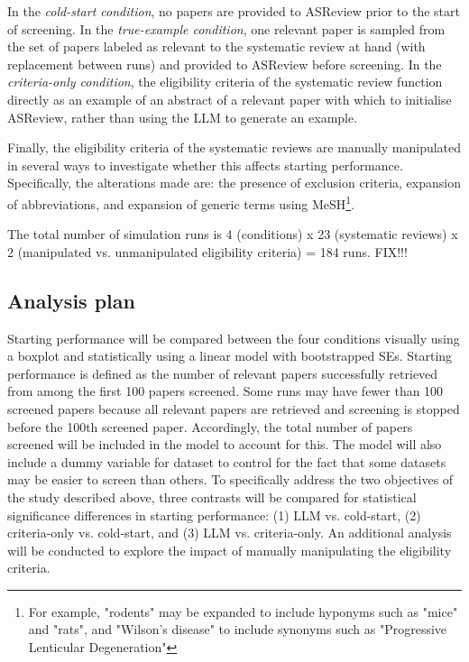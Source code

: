 \documentclass[12pt]{article}
\begin{document}
In the \textit{cold-start condition}, no papers are provided to ASReview prior to the start of screening. In the \textit{true-example condition}, one relevant paper is sampled from the set of papers labeled as relevant to the systematic review at hand (with replacement between runs) and provided to ASReview before screening. In the \textit{criteria-only condition}, the eligibility criteria of the systematic review function directly as an example of an abstract of a relevant paper with which to initialise ASReview, rather than using the LLM to generate an example.

Finally, the eligibility criteria of the systematic reviews are manually manipulated in several ways to investigate whether this affects starting performance. Specifically, the alterations made are: the presence of exclusion criteria, expansion of abbreviations, and expansion of generic terms using MeSH\footnote{For example, "rodents" may be expanded to include hyponyms such as "mice" and "rats", and "Wilson's disease" to include synonyms such as "Progressive Lenticular Degeneration"}. 

The total number of simulation runs is 4 (conditions) x 23 (systematic reviews) x 2 (manipulated vs. unmanipulated eligibility criteria) = 184 runs. FIX!!!




\subsection{Analysis plan}

Starting performance will be compared between the four conditions visually using a boxplot and statistically using a linear model with bootstrapped SEs. Starting performance is defined as the number of relevant papers successfully retrieved from among the first 100 papers screened. Some runs may have fewer than 100 screened papers because all relevant papers are retrieved and screening is stopped before the 100th screened paper. Accordingly, the total number of papers screened will be included in the model to account for this. The model will also include a dummy variable for dataset to control for the fact that some datasets may be easier to screen than others. To specifically address the two objectives of the study described above, three contrasts will be compared for statistical significance differences in starting performance: (1) LLM vs. cold-start, (2) criteria-only vs. cold-start, and (3) LLM vs. criteria-only. An additional analysis will be conducted to explore the impact of manually manipulating the eligibility criteria. 
\end{document}
